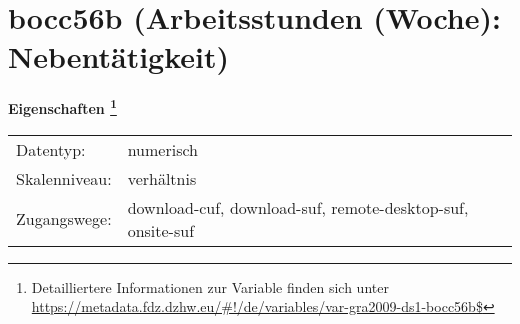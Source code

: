 
    \setcounter{footnote}{0}

    \vspace*{-1.8cm}
	\section{bocc56b (Arbeitsstunden (Woche): Nebentätigkeit)}
	\label{section:bocc56b}



    \vspace*{0.5cm}
    \noindent\textbf{Eigenschaften
	\footnote{Detailliertere Informationen zur Variable finden sich unter
		\url{https://metadata.fdz.dzhw.eu/\#!/de/variables/var-gra2009-ds1-bocc56b$}}}\\
	\begin{tabularx}{\hsize}{@{}lX}
	Datentyp: & numerisch \\
	Skalenniveau: & verhältnis \\
	Zugangswege: &
	  download-cuf, 
	  download-suf, 
	  remote-desktop-suf, 
	  onsite-suf
 \\
    \end{tabularx}



